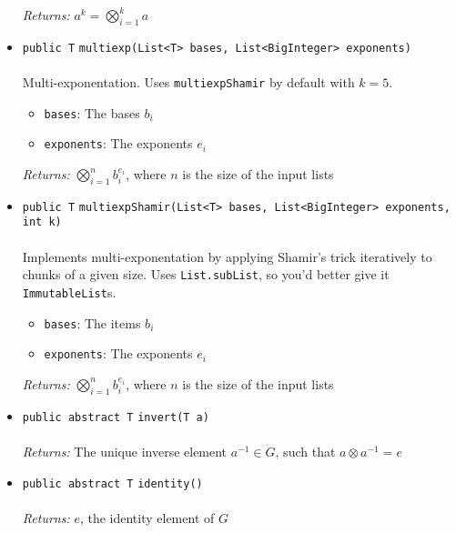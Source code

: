 \begin{itemize}
\emph{Returns:} $a^k = \bigotimes_{i=1}^{k} a$

\item \lstinline|public T| \lstinline|multiexp|\lstinline|(List<T> bases, List<BigInteger> exponents)|\\ \\[-0.6em]
Multi-exponentation. Uses \lstinline|multiexpShamir| by default
 with $k = 5$.
\begin{itemize}
\item \lstinline|bases|: The bases $b_i$
\item \lstinline|exponents|: The exponents $e_i$
\end{itemize}

\emph{Returns:} $\bigotimes_{i=1}^n b_i^{e_i}$, where $n$
         is the size of the input lists

\item \lstinline|public T| \lstinline|multiexpShamir|\lstinline|(List<T> bases, List<BigInteger> exponents, int k)|\\ \\[-0.6em]
Implements multi-exponentation by applying Shamir's trick
 iteratively to chunks of a given size.
 Uses \lstinline|List.subList|, so you'd better give it
 \lstinline|ImmutableList|s.
\begin{itemize}
\item \lstinline|bases|: The items $b_i$
\item \lstinline|exponents|: The exponents $e_i$
\end{itemize}

\emph{Returns:} $\bigotimes_{i=1}^n b_i^{e_i}$, where $n$
         is the size of the input lists

\item \lstinline|public abstract T| \lstinline|invert|\lstinline|(T a)|\\ \\[-0.6em]
\emph{Returns:} The unique inverse element $a^{-1} \in G$, such that
         $a \otimes a^{-1} = e$



\item \lstinline|public abstract T| \lstinline|identity|\lstinline|()|\\ \\[-0.6em]
\emph{Returns:} $e$, the identity element of $G$



\end{itemize}

